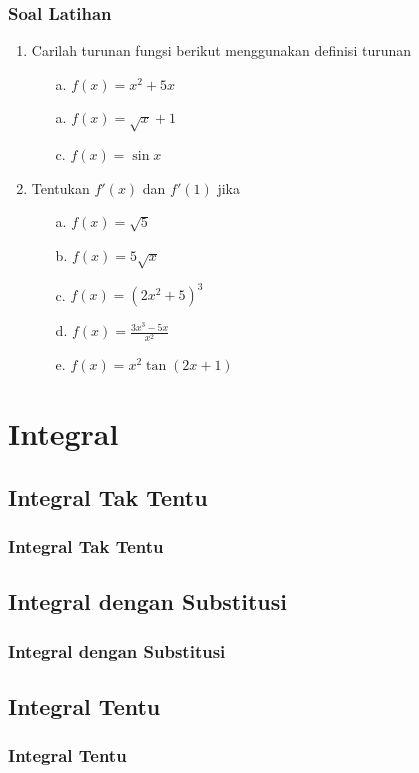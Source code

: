 \documentclass[pdflatex,compress,mathserif]{beamer}
\begin{document}
	\begin{frame}
		\frametitle{Soal Latihan}
		\begin{enumerate}
			\item Carilah turunan fungsi berikut menggunakan definisi turunan
			\begin{enumerate}
				\item[a.] $ f(x) = x^2 + 5x $
				\item[a.] $ f(x) = \sqrt{x} + 1 $
				\item[c.] $ f(x) = \sin x $
			\end{enumerate}
			\item Tentukan $ f'(x) $ dan $ f'(1) $ jika
			\begin{enumerate}
				\item[a.] $ f(x) = \sqrt{5} $
				\item[b.] $ f(x) = 5\sqrt{x} $
				\item[c.] $ f(x) = \left(2x^2+5\right)^3 $
				\item[d.] $ f(x) = \frac{3x^3-5x}{x^2} $
				\item[e.] $ f(x) = x^2 \tan(2x+1) $
			\end{enumerate}
		\vfill\null
		\end{enumerate}
	\end{frame}

\section{Integral}
	
	\subsection{Integral Tak Tentu}
		
		\begin{frame}
			\frametitle{Integral Tak Tentu}
		\end{frame}
	
	\subsection{Integral dengan Substitusi}
	
		\begin{frame}
			\frametitle{Integral dengan Substitusi}
		\end{frame}
	
	\subsection{Integral Tentu}
	
		\begin{frame}
			\frametitle{Integral Tentu}
		\end{frame}
\end{document}

